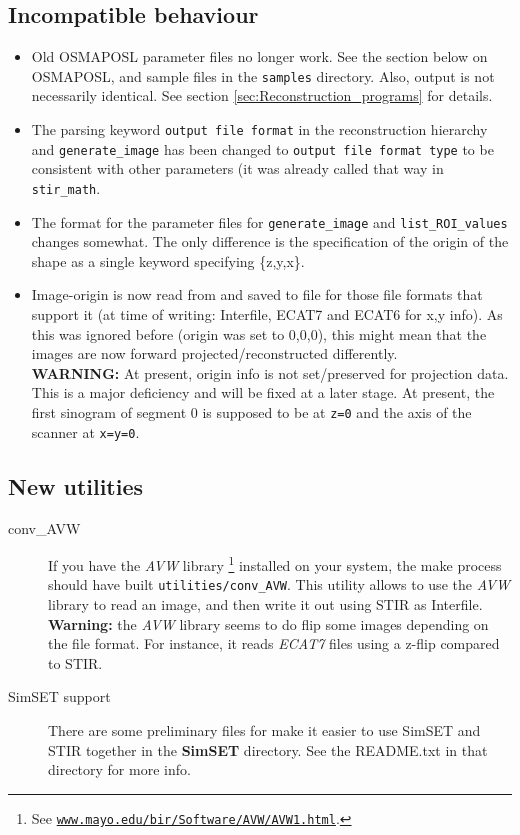 \documentclass{article}
\def\R2Lurl#1#2{\mbox{\href{#1}{\tt #2}}}
\begin{document}
\subsection{Incompatible behaviour}
\begin{itemize}
\item Old OSMAPOSL parameter files no longer work. See the section below on OSMAPOSL,
   and sample files in the \texttt{samples} directory. Also, output is not necessarily
   identical. See section \ref{sec:Reconstruction_programs} for details.
\item The parsing keyword \texttt{output file format} in the reconstruction hierarchy
and \texttt{generate\_image} has been changed to \texttt{output file format type} to
be consistent with other parameters (it was already called that way in \texttt{stir\_math}.
\item The format for the parameter files for \texttt{generate\_image} and
   \texttt{list\_ROI\_values} changes somewhat. The only difference is the
   specification of the origin of the shape as a single keyword specifying \{z,y,x\}.
\item Image-origin is now read from and saved to file for those file formats that
    support it (at time of writing: Interfile, ECAT7 and ECAT6 for x,y info).
    As this was ignored before (origin was set to 0,0,0), this might mean that 
    the images are now forward projected/reconstructed differently.\\
    \textbf{WARNING:} At present, origin info is not set/preserved for
    projection data. This is a major deficiency and will be fixed at a later stage.
   At present, the first sinogram of segment 0 is supposed to be at \texttt{z=0} and
   the axis of the scanner at \texttt{x=y=0}.
\end{itemize}

\subsection{New utilities}
\begin{description}
\item[conv\_AVW]
If you have the \textit{AVW}\texttrademark{} library
\footnote{See \R2Lurl{http://www.mayo.edu/bir/Software/AVW/AVW1.html}{www.mayo.edu/bir/Software/AVW/AVW1.html}.
} installed on your system, the make process should have built \texttt{utilities/conv\_AVW}.
This utility allows to use the \textit{AVW} library to read an image, and then write it out
using STIR as Interfile.\\
\textbf{Warning:} the \textit{AVW} library seems to do flip some images depending
on the file format. For instance, it reads \textit{ECAT7} files using a z-flip compared
to STIR.
\item[SimSET support]
There are some preliminary files for make it easier to use SimSET and STIR together in the
\textbf{SimSET} directory. See the README.txt in that directory for more info.
\end{description}
\end{document}
